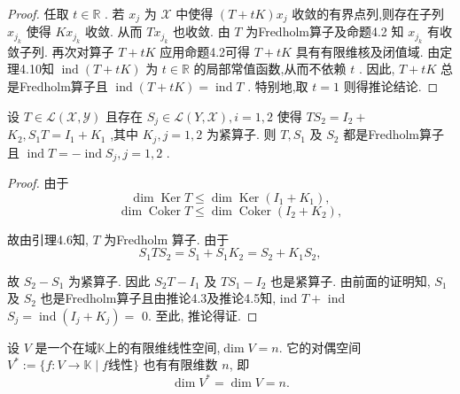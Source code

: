 \documentclass[lang=cn,newtx,10pt,scheme=chinese,thmcnt=chapter]{elegantbook}
\begin{document}
\begin{proof}
    任取 \(t \in  \mathbb{R}\) . 若 \({x}_{j}\) 为 \(\mathcal{X}\) 中使得 \(\left( {T + {tK}}\right) {x}_{j}\) 收敛的有界点列,则存在子列 \({x}_{{j}_{k}}\) 使得 \(K{x}_{{j}_{k}}\) 收敛. 从而 \(T{x}_{{j}_{k}}\) 也收敛. 由 \(T\) 为Fredholm算子及命题4.2 知 \({x}_{{j}_{k}}\) 有收敛子列. 再次对算子 \(T + {tK}\) 应用命题4.2可得 \(T + {tK}\) 具有有限维核及闭值域. 由定理4.10知 \(\operatorname{ind}\left( {T + {tK}}\right)\) 为 \(t \in  \mathbb{R}\) 的局部常值函数,从而不依赖 \(t\) . 因此, \(T + {tK}\) 总是Fredholm算子且 \(\operatorname{ind}\left( {T + {tK}}\right)  = \operatorname{ind}T\) . 特别地,取 \(t = 1\) 则得推论结论.
\end{proof}

\begin{corollary}
    设 \(T \in  \mathcal{L}\left( {\mathcal{X},\mathcal{Y}}\right)\) 且存在 \({S}_{j} \in  \mathcal{L}\left( {Y,\mathcal{X}}\right) ,i = 1,2\) 使得 \(T{S}_{2} = {I}_{2} +\)  \({K}_{2},{S}_{1}T = {I}_{1} + {K}_{1}\) ,其中 \({K}_{j},j = 1,2\) 为紧算子. 则 \(T,{S}_{1}\) 及 \({S}_{2}\) 都是Fredholm算子且 \(\operatorname{ind}T =  - \operatorname{ind}{S}_{j},j = 1,2\) .
\end{corollary}

\begin{proof}
    由于
\begin{equation*}
\dim \operatorname{Ker}T \leqslant  \dim \operatorname{Ker}\left( {{I}_{1} + {K}_{1}}\right) ,
\end{equation*}
\begin{equation*}
\dim \operatorname{Coker}T \leqslant  \dim \operatorname{Coker}\left( {{I}_{2} + {K}_{2}}\right) ,
\end{equation*}

故由引理4.6知, \(T\) 为Fredholm 算子. 由于
\begin{equation*}
{S}_{1}T{S}_{2} = {S}_{1} + {S}_{1}{K}_{2} = {S}_{2} + {K}_{1}{S}_{2},
\end{equation*}

故 \({S}_{2} - {S}_{1}\) 为紧算子. 因此 \({S}_{2}T - {I}_{1}\) 及 \(T{S}_{1} - {I}_{2}\) 也是紧算子. 由前面的证明知, \({S}_{1}\) 及 \({S}_{2}\) 也是Fredholm算子且由推论4.3及推论4.5知, ind \(T +\) ind \({S}_{j} = \operatorname{ind}\left( {{I}_{j} + {K}_{j}}\right)  =\) 0. 至此, 推论得证.
\end{proof}\begin{theorem}
设 $V$ 是一个在域$\mathbb{K}$上的有限维线性空间,$\dim V = n$. 它的对偶空间$V^* := \{ f : V \to \mathbb{K} \mid f \text{线性} \}$ 也有有限维数 $n$, 即
\[
\dim V^* = \dim V = n.
\]
\end{theorem}
\end{document}
